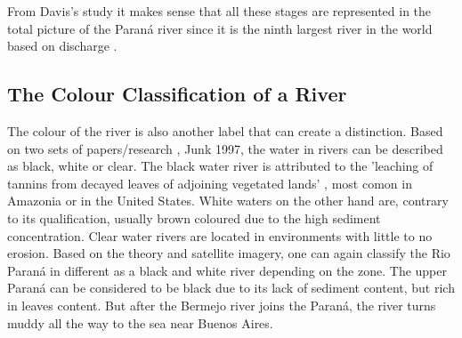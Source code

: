 From Davis's study it makes sense that all these stages are represented in the total picture of the Paraná river since it is the ninth largest river in the world based on discharge \autocite{lopez_weibel_sources_2022}.

\subsection{The Colour Classification of a River}
The colour of the river is also another label that can create a distinction. Based on two sets of papers/research  \autocite{furch_water_1984}, \autocite{sioli_amazon_1984}  Junk 1997, the water in rivers can be described as black, white or clear. The black water river is attributed to the 'leaching of tannins from decayed leaves of adjoining vegetated lands' \autocite{sand-mining-boek}, most comon in Amazonia or in the United States. White waters on the other hand are, contrary to its qualification, usually brown coloured due to the high sediment concentration. Clear water rivers are located in environments with little to no erosion.
Based on the theory and satellite imagery, one can again classify the Rio Paraná in different as a black and white river depending on the zone. The upper Paraná can be considered to be black due to its lack of sediment content, but rich in leaves content. But after the Bermejo river joins the Paraná, the river turns muddy all the way to the sea near Buenos Aires. \autocite{lopez_weibel_sources_2022}

